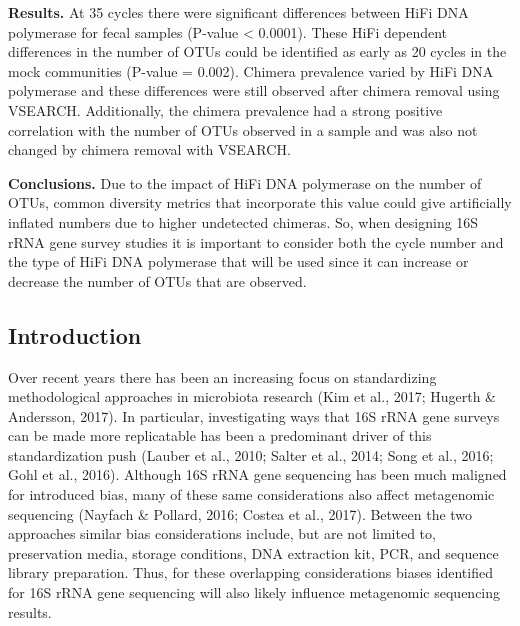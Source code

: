 \documentclass[12pt,]{article}
\begin{document}
\textbf{Results.} At 35 cycles there were significant differences
between HiFi DNA polymerase for fecal samples (P-value \textless{}
0.0001). These HiFi dependent differences in the number of OTUs could be
identified as early as 20 cycles in the mock communities (P-value =
0.002). Chimera prevalence varied by HiFi DNA polymerase and these
differences were still observed after chimera removal using VSEARCH.
Additionally, the chimera prevalence had a strong positive correlation
with the number of OTUs observed in a sample and was also not changed by
chimera removal with VSEARCH.

\textbf{Conclusions.} Due to the impact of HiFi DNA polymerase on the
number of OTUs, common diversity metrics that incorporate this value
could give artificially inflated numbers due to higher undetected
chimeras. So, when designing 16S rRNA gene survey studies it is
important to consider both the cycle number and the type of HiFi DNA
polymerase that will be used since it can increase or decrease the
number of OTUs that are observed.

\newpage

\subsection{Introduction}\label{introduction}

Over recent years there has been an increasing focus on standardizing
methodological approaches in microbiota research (Kim et al., 2017;
Hugerth \& Andersson, 2017). In particular, investigating ways that 16S
rRNA gene surveys can be made more replicatable has been a predominant
driver of this standardization push (Lauber et al., 2010; Salter et al.,
2014; Song et al., 2016; Gohl et al., 2016). Although 16S rRNA gene
sequencing has been much maligned for introduced bias, many of these
same considerations also affect metagenomic sequencing (Nayfach \&
Pollard, 2016; Costea et al., 2017). Between the two approaches similar
bias considerations include, but are not limited to, preservation media,
storage conditions, DNA extraction kit, PCR, and sequence library
preparation. Thus, for these overlapping considerations biases
identified for 16S rRNA gene sequencing will also likely influence
metagenomic sequencing results.
\end{document}
